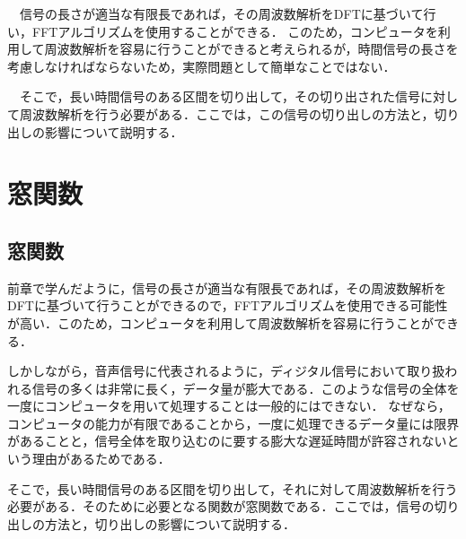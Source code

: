 
\begin{lead}

　信号の長さが適当な有限長であれば，その周波数解析をDFTに基づいて行い，FFTアルゴリズムを使用することができる．
%
このため，コンピュータを利用して周波数解析を容易に行うことができると考えられるが，時間信号の長さを考慮しなければならないため，実際問題として簡単なことではない．

　そこで，長い時間信号のある区間を切り出して，その切り出された信号に対して周波数解析を行う必要がある．ここでは，この信号の切り出しの方法と，切り出しの影響について説明する．


\end{lead}




\chapter{窓関数}
\label{chapter:window}

\section{窓関数}

前章で学んだように，信号の長さが適当な有限長であれば，その周波数解析をDFTに基づいて行うことができるので，FFTアルゴリズムを使用できる可能性が高い．このため，コンピュータを利用して周波数解析を容易に行うことができる．

しかしながら，音声信号に代表されるように，ディジタル信号において取り扱われる信号の多くは非常に長く，データ量が膨大である．このような信号の全体を一度にコンピュータを用いて処理することは一般的にはできない．
%
なぜなら，コンピュータの能力が有限であることから，一度に処理できるデータ量には限界があることと，信号全体を取り込むのに要する膨大な遅延時間が許容されないという理由があるためである．

そこで，長い時間信号のある区間を切り出して，それに対して周波数解析を行う必要がある．そのために必要となる関数が窓関数である．ここでは，信号の切り出しの方法と，切り出しの影響について説明する．

